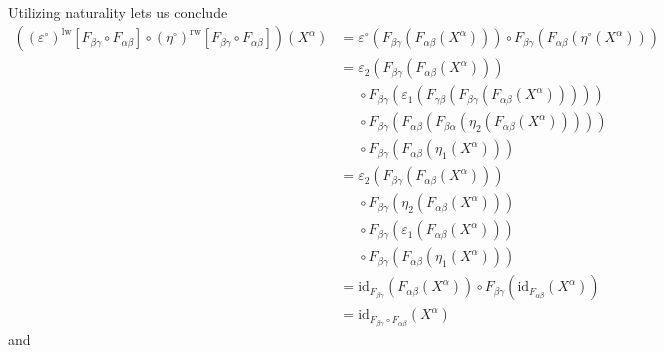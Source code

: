 \begin{prf}
\begin{align*}
\end{align*}
Utilizing naturality lets us conclude 
\begin{align*}
  \left(
    (\varepsilon^{\circ})^{\textrm{lw}}[F_{\beta\gamma} \circ F_{\alpha\beta}]
    \circ
    (\eta^{\circ})^{\textrm{rw}}[F_{\beta\gamma} \circ F_{\alpha\beta}]
  \right)
  (X^{\alpha})
  &=
  \varepsilon^{\circ}
  \left(
    F_{\beta\gamma}
    \left(
      F_{\alpha\beta}(X^{\alpha})
    \right)
  \right)
  \circ
  F_{\beta\gamma}
  \left(
    F_{\alpha\beta}
    \left(
      \eta^{\circ}(X^{\alpha})
    \right)
  \right)
  \\
  &=
  \varepsilon_{2}
  \left(
    F_{\beta\gamma}
    \left(
      F_{\alpha\beta}(X^{\alpha})
    \right)
  \right)
  \\
  &\phantom{=}
  \circ
  F_{\beta\gamma}
  \left(
    \varepsilon_{1}
    \left(
      F_{\gamma\beta}
      \left(
        F_{\beta\gamma}
        \left(
          F_{\alpha\beta}(X^{\alpha})
        \right)
      \right)
    \right)
  \right)
  \\
  &\phantom{=}
  \circ
  F_{\beta\gamma}
  \left(
    F_{\alpha\beta}
    \left(
      F_{\beta\alpha}
      \left(
        \eta_{2}
        \left(
          F_{\alpha\beta}(X^{\alpha})
        \right)
      \right)
    \right)
  \right)
  \\
  &\phantom{=}
  \circ
  F_{\beta\gamma}
  \left(
    F_{\alpha\beta}
    \left(
      \eta_{1}(X^{\alpha})
    \right)
  \right)
  \\
  &=
  \varepsilon_{2}
  \left(
    F_{\beta\gamma}
    \left(
      F_{\alpha\beta}(X^{\alpha})
    \right)
  \right)
  \\
  &\phantom{=}
  \circ
  F_{\beta\gamma}
  \left(
    \eta_{2}
    \left(
      F_{\alpha\beta}(X^{\alpha})
    \right)
  \right)
  \\
  &\phantom{=}
  \circ
  F_{\beta\gamma}
  \left(
    \varepsilon_{1}
    \left(
      F_{\alpha\beta}(X^{\alpha})
    \right)
  \right)
  \\
  &\phantom{=}
  \circ
  F_{\beta\gamma}
  \left(
    F_{\alpha\beta}
    \left(
      \eta_{1}(X^{\alpha})
    \right)
  \right)
  \tag{NT}
  \\
  &=
  \mathrm{id}_{F_{\beta\gamma}}
  \left(
    F_{\alpha\beta}(X^{\alpha})
  \right)
  \circ
  F_{\beta\gamma}
  \left(
    \mathrm{id}_{F_{\alpha\beta}}(X^{\alpha})
  \right)
  \\
  &=
  \mathrm{id}_{F_{\beta\gamma} \circ F_{\alpha\beta}}(X^{\alpha})
\end{align*}
and

\end{prf}
